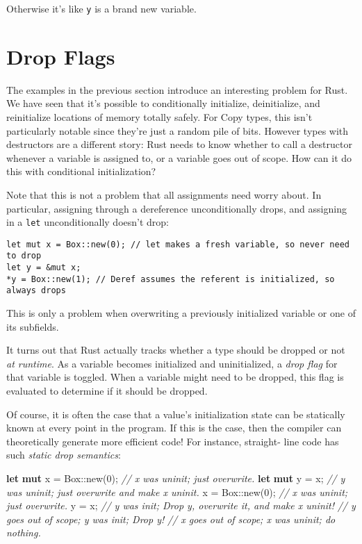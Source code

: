 \documentclass[a4paper,]{book}
\newenvironment{Shaded}{\begin{snugshade}}{\end{snugshade}}
\newcommand{\KeywordTok}[1]{\textcolor[rgb]{0.13,0.29,0.53}{\textbf{{#1}}}}
\newcommand{\DataTypeTok}[1]{\textcolor[rgb]{0.13,0.29,0.53}{{#1}}}
\newcommand{\DecValTok}[1]{\textcolor[rgb]{0.00,0.00,0.81}{{#1}}}
\newcommand{\CommentTok}[1]{\textcolor[rgb]{0.56,0.35,0.01}{\textit{{#1}}}}
\newcommand{\NormalTok}[1]{{#1}}
\begin{document}
Otherwise it's like \texttt{y} is a brand new variable.

\hypertarget{sec--drop-flags}{\section{Drop
Flags}\label{sec--drop-flags}}

The examples in the previous section introduce an interesting problem
for Rust. We have seen that it's possible to conditionally initialize,
deinitialize, and reinitialize locations of memory totally safely. For
Copy types, this isn't particularly notable since they're just a random
pile of bits. However types with destructors are a different story: Rust
needs to know whether to call a destructor whenever a variable is
assigned to, or a variable goes out of scope. How can it do this with
conditional initialization?

Note that this is not a problem that all assignments need worry about.
In particular, assigning through a dereference unconditionally drops,
and assigning in a \texttt{let} unconditionally doesn't drop:

\begin{verbatim}
let mut x = Box::new(0); // let makes a fresh variable, so never need to drop
let y = &mut x;
*y = Box::new(1); // Deref assumes the referent is initialized, so always drops
\end{verbatim}

This is only a problem when overwriting a previously initialized
variable or one of its subfields.

It turns out that Rust actually tracks whether a type should be dropped
or not \emph{at runtime}. As a variable becomes initialized and
uninitialized, a \emph{drop flag} for that variable is toggled. When a
variable might need to be dropped, this flag is evaluated to determine
if it should be dropped.

Of course, it is often the case that a value's initialization state can
be statically known at every point in the program. If this is the case,
then the compiler can theoretically generate more efficient code! For
instance, straight- line code has such \emph{static drop semantics}:

\begin{Shaded}
\begin{Highlighting}[]
\KeywordTok{let} \KeywordTok{mut} \NormalTok{x = }\DataTypeTok{Box}\NormalTok{::new(}\DecValTok{0}\NormalTok{); }\CommentTok{// x was uninit; just overwrite.}
\KeywordTok{let} \KeywordTok{mut} \NormalTok{y = x;           }\CommentTok{// y was uninit; just overwrite and make x uninit.}
\NormalTok{x = }\DataTypeTok{Box}\NormalTok{::new(}\DecValTok{0}\NormalTok{);         }\CommentTok{// x was uninit; just overwrite.}
\NormalTok{y = x;                   }\CommentTok{// y was init; Drop y, overwrite it, and make x uninit!}
                         \CommentTok{// y goes out of scope; y was init; Drop y!}
                         \CommentTok{// x goes out of scope; x was uninit; do nothing.}
\end{Highlighting}
\end{Shaded}
\end{document}
